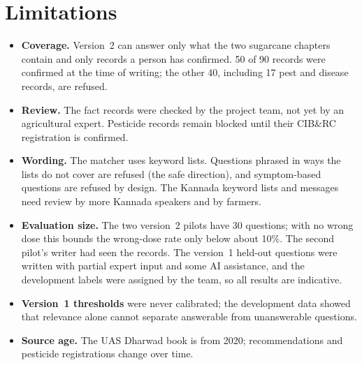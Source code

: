 \section{Limitations}
\begin{itemize}
  \item \textbf{Coverage.} Version~2 can answer only what the two sugarcane chapters
    contain and only records a person has confirmed. 50 of 90 records were confirmed
    at the time of writing; the other 40, including 17 pest and disease records, are
    refused.
  \item \textbf{Review.} The fact records were checked by the project team, not yet by an
    agricultural expert. Pesticide records remain blocked until their CIB\&RC registration
    is confirmed.
  \item \textbf{Wording.} The matcher uses keyword lists. Questions phrased in ways the lists
    do not cover are refused (the safe direction), and symptom-based questions are refused
    by design. The Kannada keyword lists and messages need review by more Kannada speakers
    and by farmers.
  \item \textbf{Evaluation size.} The two version~2 pilots have 30 questions; with no wrong
    dose this bounds the wrong-dose rate only below about 10\%. The second pilot's writer had
    seen the records. The version~1 held-out questions were
    written with partial expert input and some AI assistance, and the development labels
    were assigned by the team, so all results are indicative.
  \item \textbf{Version~1 thresholds} were never calibrated; the development data showed that
    relevance alone cannot separate answerable from unanswerable questions.
  \item \textbf{Source age.} The UAS Dharwad book is from 2020; recommendations and pesticide
    registrations change over time.
\end{itemize}

